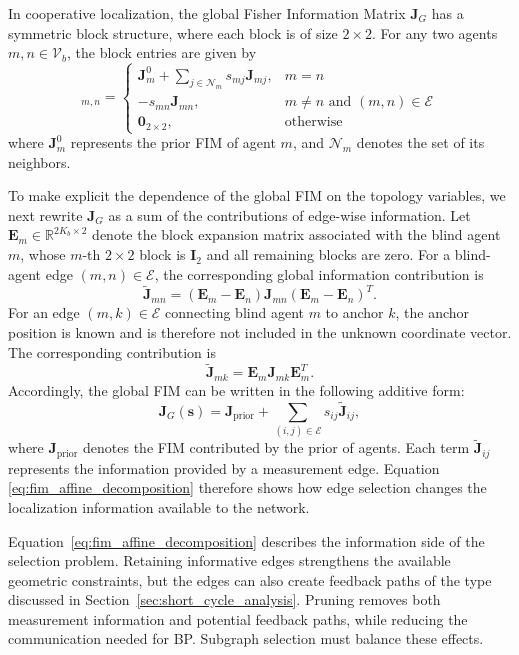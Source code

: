 In cooperative localization, the global Fisher Information Matrix $\mathbf{J}_{G}$ has a symmetric block structure, where each block is of size $2 \times 2$. For any two agents $m, n \in \mathcal{V}_b$, the block entries are given by
\begin{equation}
    [\mathbf{J}_G]_{m,n} =
    \begin{cases} 
        \mathbf{J}_m^0 + \sum_{j \in \mathcal{N}_m} s_{mj} \mathbf{J}_{mj}, & m = n \\ 
        -s_{mn} \mathbf{J}_{mn}, & m \neq n \text{ and } (m,n) \in \mathcal{E} \\ 
        \mathbf{0}_{2 \times 2}, & \text{otherwise} 
    \end{cases}
\end{equation}
where $\mathbf{J}_m^0$ represents the prior FIM of agent $m$, and $\mathcal{N}_m$ denotes the set of its neighbors.

To make explicit the dependence of the global FIM on the topology variables, we next rewrite $\mathbf{J}_G$ as a sum of the contributions of edge-wise information. Let $\mathbf{E}_m \in \mathbb{R}^{2K_b \times 2}$ denote the block expansion matrix associated with the blind agent $m$, whose $m$-th $2 \times 2$ block is $\mathbf{I}_2$ and all remaining blocks are zero. For a blind-agent edge $(m,n) \in \mathcal{E}$, the corresponding global information contribution is
\[
    \widetilde{\mathbf{J}}_{mn} = (\mathbf{E}_m - \mathbf{E}_n)\mathbf{J}_{mn}(\mathbf{E}_m - \mathbf{E}_n)^T.
\]
For an edge $(m,k) \in \mathcal{E}$ connecting blind agent $m$ to anchor $k$, the anchor position is known and is therefore not included in the unknown coordinate vector. The corresponding contribution is
\[
    \widetilde{\mathbf{J}}_{mk} = \mathbf{E}_m\mathbf{J}_{mk}\mathbf{E}_m^T.
\]
Accordingly, the global FIM can be written in the following additive form:
\begin{equation}
    \mathbf{J}_G(\mathbf{s}) = \mathbf{J}_{\mathrm{prior}} + \sum_{(i,j)\in\mathcal{E}}s_{ij}\widetilde{\mathbf{J}}_{ij},
    \label{eq:fim_affine_decomposition}
\end{equation}
where $\mathbf{J}_{\mathrm{prior}}$ denotes the FIM contributed by the prior of agents. Each term $\widetilde{\mathbf{J}}_{ij}$ represents the information provided by a measurement edge. Equation \eqref{eq:fim_affine_decomposition} therefore shows how edge selection changes the localization information available to the network.

Equation~\eqref{eq:fim_affine_decomposition} describes the information side of the selection problem. Retaining informative edges strengthens the available geometric constraints, but the edges can also create feedback paths of the type discussed in Section~\ref{sec:short_cycle_analysis}. Pruning removes both measurement information and potential feedback paths, while reducing the communication needed for BP. Subgraph selection must balance these effects.

